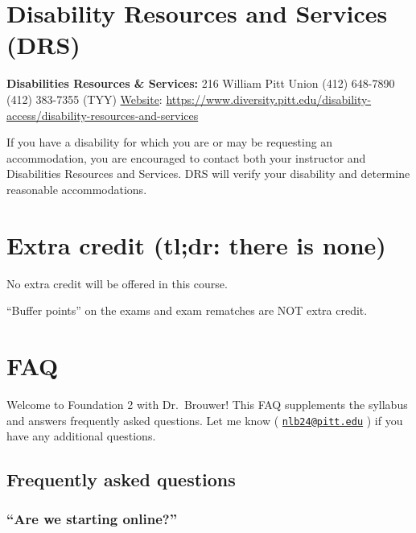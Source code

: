 \documentclass[
]{book}
\begin{document}
\hypertarget{disability-resources-and-services-drs}{%
\chapter{Disability Resources and Services (DRS)}\label{disability-resources-and-services-drs}}

\textbf{Disabilities Resources \& Services:}
216 William Pitt Union
(412) 648-7890
(412) 383-7355 (TYY)
\href{https://www.diversity.pitt.edu/disability-access/disability-resources-and-services}{Website}: \url{https://www.diversity.pitt.edu/disability-access/disability-resources-and-services}

If you have a disability for which you are or may be requesting an accommodation, you are encouraged to contact both your instructor and Disabilities Resources and Services. DRS will verify your disability and determine reasonable accommodations.

\hypertarget{extra-credit-tldr-there-is-none}{%
\chapter{Extra credit (tl;dr: there is none)}\label{extra-credit-tldr-there-is-none}}

No extra credit will be offered in this course.

``Buffer points'' on the exams and exam rematches are NOT extra credit.

\hypertarget{faq}{%
\chapter{FAQ}\label{faq}}

Welcome to Foundation 2 with Dr.~Brouwer! This FAQ supplements the syllabus and answers frequently asked questions. Let me know ( \href{mailto:nlb24@pitt.edu}{\nolinkurl{nlb24@pitt.edu}} ) if you have any additional questions.

\hypertarget{frequently-asked-questions}{%
\section{Frequently asked questions}\label{frequently-asked-questions}}

\hypertarget{are-we-starting-online}{%
\subsection{``Are we starting online?''}\label{are-we-starting-online}}
\end{document}
